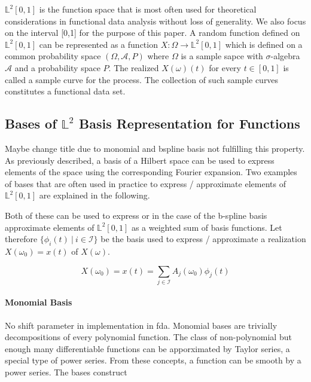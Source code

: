 \documentclass[11pt,twoside,a4paper]{article}
\begin{document}
	$\mathbb{L}^2[0,1]$ is the function space that is most often used for theoretical considerations in functional data analysis without loss of generality. We also focus on the interval [0,1] for the purpose of this paper.	A random function defined on $\mathbb{L}^2[0,1]$ can be represented as
	a function $X : \Omega \rightarrow \mathbb{L}^2[0,1]$ which is defined on a common probability space $(\Omega, \mathcal{A}, P)$ where $\Omega$ is a sample sapce with $\sigma$-algebra $\mathcal{A}$ and a probability space $P$. The realized $X(\omega)(t)$ for every $t \in [0,1]$ is called a sample curve for the process. The collection of such sample curves constitutes a functional data set.
	
	
	\subsection{Bases of $\mathbb{L}^2$ {\color{orange}Basis Representation for Functions}} 
	{\color{red} Maybe change title due to monomial and bspline basis not fulfilling this property.}
	As previously described, a basis of a Hilbert space can be used to express elements of the space using the corresponding Fourier expansion. Two examples of bases that are often used in practice to express / approximate elements of $\mathbb{L}^2[0,1]$  are explained in the following.
	
	Both of these can be used to express or in the case of the b-spline basis approximate elements of $\mathbb{L}^2[0,1]$ as a weighted sum of basis functions. Let therefore $\{\phi_i(t) \: \vert \: i \in \mathcal{I}\}$ be the basis used to express / approximate a realization $X(\omega_0) = x(t)$ of $X(\omega)$.
	
	\begin{equation}
		X(\omega_0) = x(t) = \sum_{j \in \mathcal{I}} A_{j}(\omega_0) \phi_j(t)
	\end{equation}
	
	\paragraph{Monomial Basis}
	{\color{red} No shift parameter in implementation in fda.}  Monomial bases are trivially decompositions of every polynomial function. The class of non-polynomial but enough many differentiable functions can be apporximated by Taylor series, a special type of power series. From these concepts, a function can be smooth by a power series. The bases construct 
\end{document}
